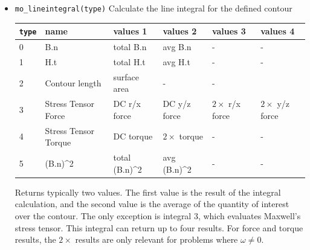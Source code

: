 \begin{itemize}
\item{\tt mo\_lineintegral(type)} Calculate the line integral for the defined contour
\begin{small}\begin{center}
\begin{tabular}{llllll}\hline
 {\tt type} & name & values 1 & values 2 & values 3 & values 4 \\  \hline
 0 & B.n & total B.n & avg B.n & - & -\\
 1 & H.t & total H.t & avg H.t & - & - \\
 2 & Contour length & surface area & - & -\\
 3 & Stress Tensor Force & DC r/x force & DC y/z force & $2\times$ r/x force & $2\times$ y/z force \\
 4 & Stress Tensor Torque& DC torque & $2\times$ torque & - & - \\
 5 & (B.n)\^{}2 & total (B.n)\^{}2 & avg (B.n)\^{}2 & - & - \\ \hline
\end{tabular}
\end{center}
\end{small}
Returns typically two values. The first
value is the result of the integral calculation, and
the second value is the average of the quantity of interest over the contour.
The only exception is integral 3, which evaluates Maxwell's stress
tensor.  This integral can return up to four results. For force
and torque results, the $2\times$ results are only relevant for
problems where $\omega \neq 0$.


\end{itemize}
